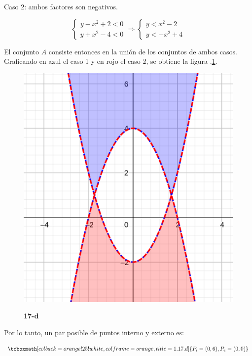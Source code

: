 \documentclass{article}
\begin{document}
Caso 2: ambos factores son negativos.

\begin{equation}
\left\{ \begin{array}{ll}
y - x^2 + 2 < 0 \\
y + x^2 -4 < 0
\end{array}
\right. \Rightarrow \left\{ \begin{array}{ll}
y < x^2 - 2 \\
y < -x^2 + 4
\end{array}
\right.
\end{equation}

El conjunto $A$ consiste entonces en la unión de los conjuntos de ambos casos. Graficando en azul el caso 1 y en rojo el caso 2, se obtiene la figura .\ref{fig:1-17-d}.

\begin{figure}[ht]
\caption{\textbf{17-d}}
\includegraphics[scale=1]{img/ejercicios/1/17-d.png} 
\centering
\label{fig:1-17-d}
\end{figure}

Por lo tanto, un par posible de puntos interno y externo es:

\begin{equation}
\tcboxmath[colback=orange!25!white,colframe=orange,title=1.17.d]
{
P_i = (0, 6), P_e = (0, 0)
}
\end{equation}
\end{document}
